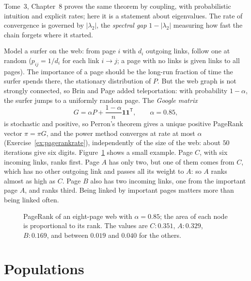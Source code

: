 Tome~3, Chapter~8 proves the same theorem by coupling, with probabilistic intuition and explicit rates; here it is a statement
about eigenvalues. The rate of convergence is governed by $|\lambda_2|$, the \emph{spectral gap} $1-|\lambda_2|$ measuring how fast
the chain forgets where it started.

\begin{example}[PageRank]\label{exa:pagerank}
Model a surfer on the web: from page $i$ with $d_i$ outgoing links, follow one at random ($p_{ij}=1/d_i$ for each link
$i\to j$; a page with no links is given links to all pages). The importance of a page should be the long-run fraction of
time the surfer spends there, the stationary distribution of $P$. But the web graph is not strongly connected, so Brin and
Page added teleportation: with probability $1-\alpha$, the surfer jumps to a uniformly random page. The \emph{Google matrix}
\[
G=\alpha P+\frac{1-\alpha}n\mathbf 1\mathbf 1^{\mathsf T},\qquad\alpha=0.85,
\]
is stochastic and positive, so Perron's theorem gives a unique positive PageRank vector $\pi=\pi G$, and the power method
converges at rate at most $\alpha$ (Exercise~\ref{ex:pagerankrate}), independently of the size of the web: about $50$
iterations give six digits. Figure~\ref{fig:pagerank} shows a small example. Page $C$, with six incoming links, ranks first. Page $A$
has only two, but one of them comes from $C$, which has no other outgoing link and passes all its weight to $A$: so $A$ ranks
almost as high as $C$. Page $B$ also has two incoming links, one from the important page $A$, and ranks third. Being linked by
important pages matters more than being linked often.
\end{example}

\begin{figure}[ht]
\centering
{}
\caption{PageRank of an eight-page web with $\alpha=0.85$; the area of each node is proportional to its rank. The values
are $C:0.351$, $A:0.329$, $B:0.169$, and between $0.019$ and $0.040$ for the others.}
\label{fig:pagerank}
\end{figure}

\section{Populations}

